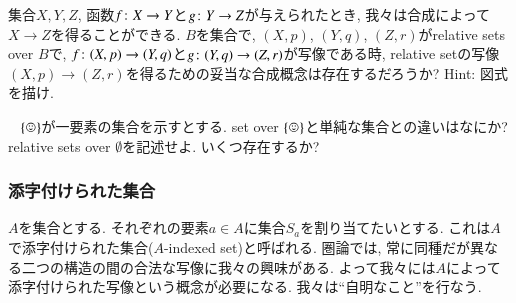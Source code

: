 \begin{exercise}
集合$X,Y,Z$, 函数$f\colon X\rightarrow Y$と$g\colon Y\rightarrow Z$が与えられたとき, 我々は合成によって$X\to Z$を得ることができる. $B$を集合で, $(X,p)$, $(Y,q)$, $(Z,r)$がrelative sets over $B$で, $f\colon (X,p)\rightarrow (Y,q)$と$g\colon (Y,q)\rightarrow (Z,r)$が写像である時, relative setの写像$(X,p)\to (Z,r)$を得るための妥当な合成概念は存在するだろうか? Hint: 図式を描け.
\end{exercise}

\begin{exercise}~
\sexc $\singleton$が一要素の集合を示すとする. set over $\singleton$と単純な集合との違いはなにか?
\next relative sets over $\emptyset$を記述せよ. いくつ存在するか?
\endsexc
\end{exercise}


\subsubsection{添字付けられた集合}\label{sec:indexed sets}


$A$を集合とする. それぞれの要素$a\in A$に集合$S_a$を割り当てたいとする. これは$A$で添字付けられた集合($A$-indexed set)と呼ばれる. 圏論では, 常に同種だが異なる二つの構造の間の合法な写像に我々の興味がある. よって我々には$A$によって添字付けられた写像という概念が必要になる. 我々は``自明なこと''を行なう.

